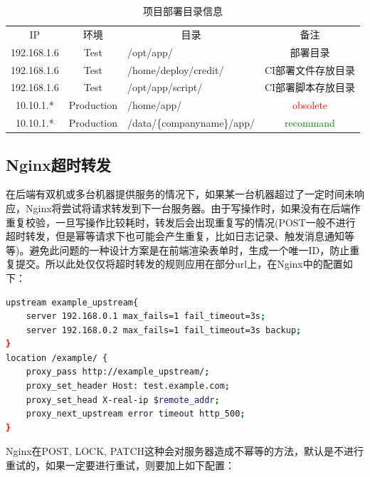 \documentclass{book}
\begin{document}
\begin{table}[htbp]
	\caption{项目部署目录信息}
	\label{table:projectdirectionayinfo}
	\begin{center}
		\begin{tabular}{|c|c|p{5cm}|c|}
			\hline
			\multirow{1}{*}{IP}
			& \multicolumn{1}{c|}{环境} 
			& \multicolumn{1}{c|}{目录}
			& \multicolumn{1}{c|}{备注}\\			
			\cline{1-4}
			192.168.1.6 &  Test  & /opt/app/ & 部署目录 \\
			\hline
			192.168.1.6 &  Test  & /home/deploy/credit/ & CI部署文件存放目录 \\
			\hline
			192.168.1.6 &  Test  & /opt/app/script/ & CI部署脚本存放目录 \\
			\hline
			10.10.1.* &  Production  & /home/app/ & \textcolor{red}{obsolete} \\
			\hline
			10.10.1.* &  Production  & /data/\{companyname\}/app/ & \textcolor{green}{recommand} \\
			\hline							
		\end{tabular}	
	\end{center}
\end{table}

\subsection{Nginx超时转发}

在后端有双机或多台机器提供服务的情况下，如果某一台机器超过了一定时间未响应，Nginx将尝试将请求转发到下一台服务器。由于写操作时，如果没有在后端作重复校验，一旦写操作比较耗时，转发后会出现重复写的情况(POST一般不进行超时转发，但是幂等请求下也可能会产生重复，比如日志记录、触发消息通知等等)。避免此问题的一种设计方案是在前端渲染表单时，生成一个唯一ID，防止重复提交。所以此处仅仅将超时转发的规则应用在部分url上，在Nginx中的配置如下：

\begin{lstlisting}[language=Bash]
upstream example_upstream{
	server 192.168.0.1 max_fails=1 fail_timeout=3s;
	server 192.168.0.2 max_fails=1 fail_timeout=3s backup;
}
location /example/ {
	proxy_pass http://example_upstream/;
	proxy_set_header Host: test.example.com;
	proxy_set_head X-real-ip $remote_addr;
	proxy_next_upstream error timeout http_500;
}
\end{lstlisting}

Nginx在POST, LOCK, PATCH这种会对服务器造成不幂等的方法，默认是不进行重试的，如果一定要进行重试，则要加上如下配置：
\end{document}
